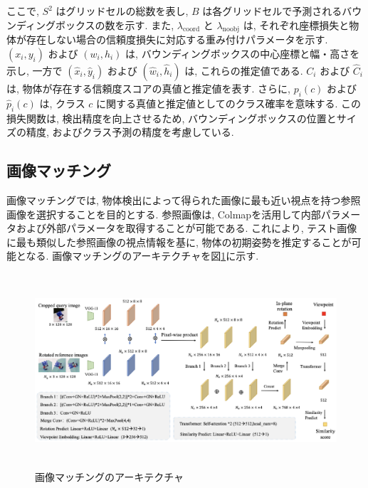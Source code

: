 ここで, $S^2$ はグリッドセルの総数を表し, $B$ は各グリッドセルで予測されるバウンディングボックスの数を示す. 
また, $\lambda_{\text{coord}}$ と $\lambda_{\text{noobj}}$ は, それぞれ座標損失と物体が存在しない場合の信頼度損失に対応する重み付けパラメータを示す. 
$(x_i, y_i)$ および $(w_i, h_i)$ は, バウンディングボックスの中心座標と幅・高さを示し, 一方で $(\hat{x}_i, \hat{y}_i)$ および $(\hat{w}_i, \hat{h}_i)$ は, これらの推定値である. 
$C_i$ および $\hat{C}_i$ は, 物体が存在する信頼度スコアの真値と推定値を表す. 
さらに, $p_i(c)$ および $\hat{p}_i(c)$ は, クラス $c$ に関する真値と推定値としてのクラス確率を意味する. 
この損失関数は, 検出精度を向上させるため, バウンディングボックスの位置とサイズの精度, およびクラス予測の精度を考慮している. 

\subsection{画像マッチング}
画像マッチングでは, 物体検出によって得られた画像に最も近い視点を持つ参照画像を選択することを目的とする. 
参照画像は, Colmapを活用して内部パラメータおよび外部パラメータを取得することが可能である. 
これにより, テスト画像に最も類似した参照画像の視点情報を基に, 物体の初期姿勢を推定することが可能となる. 
画像マッチングのアーキテクチャを図\ref{fig:2-f5}に示す. 
\begin{figure}[htbt]
	\centering
	 \includegraphics[height=72mm]{Figure/selector_arc.eps}
	 \caption{画像マッチングのアーキテクチャ}
	 \label{fig:2-f5}
\end{figure}

